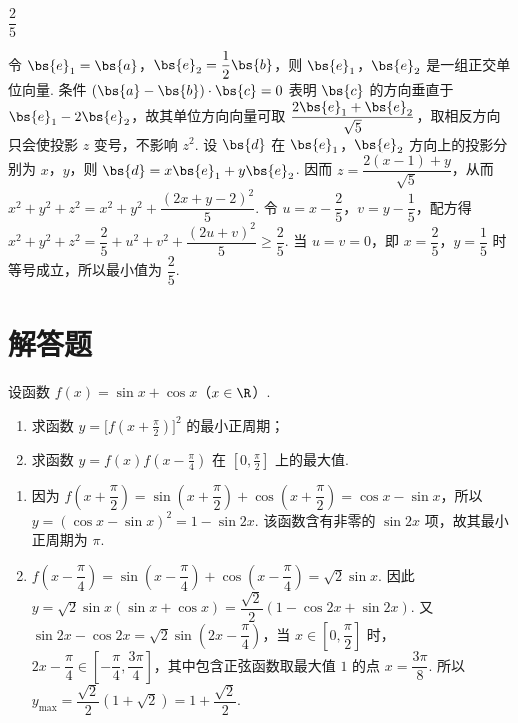 \begin{answer}
\(\dfrac{2}{5}\)
\end{answer}

\begin{solution}
令 \(\bs{e}_{1}=\bs{a}\)，\(\bs{e}_{2}=\dfrac12\bs{b}\)，则 \(\bs{e}_{1}\)，\(\bs{e}_{2}\) 是一组正交单位向量. 条件 \((\bs{a}-\bs{b})\cdot\bs{c}=0\) 表明 \(\bs{c}\) 的方向垂直于 \(\bs{e}_{1}-2\bs{e}_{2}\)，故其单位方向向量可取 \(\dfrac{2\bs{e}_{1}+\bs{e}_{2}}{\sqrt5}\)，取相反方向只会使投影 \(z\) 变号，不影响 \(z^{2}\).
设 \(\bs{d}\) 在 \(\bs{e}_{1}\)，\(\bs{e}_{2}\) 方向上的投影分别为 \(x\)，\(y\)，则 \(\bs{d}=x\bs{e}_{1}+y\bs{e}_{2}\). 因而
\(z=\dfrac{2(x-1)+y}{\sqrt5}\)，从而
\(x^{2}+y^{2}+z^{2}=x^{2}+y^{2}+\dfrac{(2x+y-2)^{2}}5\).
令 \(u=x-\dfrac25\)，\(v=y-\dfrac15\)，配方得
\(x^{2}+y^{2}+z^{2}=\dfrac25+u^{2}+v^{2}+\dfrac{(2u+v)^{2}}5\geq\dfrac25\). 当 \(u=v=0\)，即 \(x=\dfrac25\)，\(y=\dfrac15\) 时等号成立，所以最小值为 \(\dfrac25\).
\end{solution}

\section{解答题}

\begin{problem}
设函数 \(f(x)=\sin x+\cos x\)（\(x\in\R\)）.

\begin{enumerate}
\item 求函数 \(y=\bigl[f(x+\tfrac{\pi}{2})\bigr]^2\) 的最小正周期；

\item 求函数 \(y=f(x)f(x-\tfrac{\pi}{4})\) 在 \([0,\frac{\pi}{2}]\) 上的最大值.
\end{enumerate}
\end{problem}

\begin{solution}
\begin{enumerate}
\item 因为 \(f\left(x+\dfrac{\pi}{2}\right)=\sin\left(x+\dfrac{\pi}{2}\right)+\cos\left(x+\dfrac{\pi}{2}\right)=\cos x-\sin x\)，所以
\(y=(\cos x-\sin x)^{2}=1-\sin2x\). 该函数含有非零的 \(\sin2x\) 项，故其最小正周期为 \(\pi\).

\item \(f\left(x-\dfrac{\pi}{4}\right)=\sin\left(x-\dfrac{\pi}{4}\right)+\cos\left(x-\dfrac{\pi}{4}\right)=\sqrt2\sin x\). 因此
\(y=\sqrt2\sin x(\sin x+\cos x)=\dfrac{\sqrt2}{2}\left(1-\cos2x+\sin2x\right)\).
又 \(\sin2x-\cos2x=\sqrt2\sin\left(2x-\dfrac{\pi}{4}\right)\)，当 \(x\in\left[0,\dfrac{\pi}{2}\right]\) 时，\(2x-\dfrac{\pi}{4}\in\left[-\dfrac{\pi}{4},\dfrac{3\pi}{4}\right]\)，其中包含正弦函数取最大值 \(1\) 的点 \(x=\dfrac{3\pi}{8}\). 所以
\(y_{\max}=\dfrac{\sqrt2}{2}(1+\sqrt2)=1+\dfrac{\sqrt2}{2}\).
\end{enumerate}
\end{solution}

